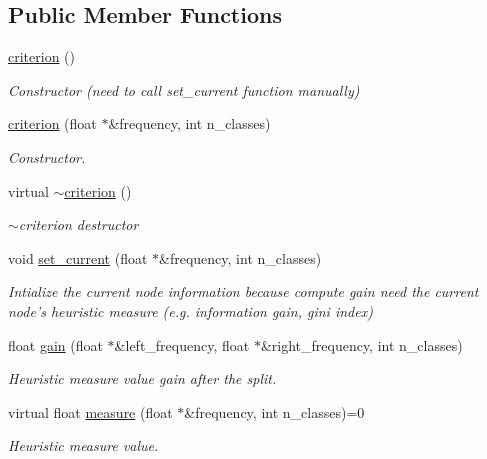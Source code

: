 \subsection*{Public Member Functions}
\begin{DoxyCompactItemize}
\item 
\hyperlink{classcriterion_a5047629e45833624bc6955cc0dd106b8}{criterion} ()
\begin{DoxyCompactList}\small\item\em Constructor (need to call {\ttfamily set\+\_\+current} function manually) \end{DoxyCompactList}\item 
\hyperlink{classcriterion_acf80c0b2acf9fb6f2b8369868cafdbff}{criterion} (float $\ast$\&frequency, int n\+\_\+classes)
\begin{DoxyCompactList}\small\item\em Constructor. \end{DoxyCompactList}\item 
virtual \hyperlink{classcriterion_aab29d10fad28cb5eeb5d3e212ecb5656}{$\sim$criterion} ()
\begin{DoxyCompactList}\small\item\em $\sim$criterion destructor \end{DoxyCompactList}\item 
void \hyperlink{classcriterion_a043c2105b2cfc256cb530c55b65156f2}{set\+\_\+current} (float $\ast$\&frequency, int n\+\_\+classes)
\begin{DoxyCompactList}\small\item\em Intialize the current node information because compute {\ttfamily gain} need the current node's heuristic measure (e.\+g. information gain, gini index) \end{DoxyCompactList}\item 
float \hyperlink{classcriterion_a8d42878c94bae5a72475b568bcbbddfa}{gain} (float $\ast$\&left\+\_\+frequency, float $\ast$\&right\+\_\+frequency, int n\+\_\+classes)
\begin{DoxyCompactList}\small\item\em Heuristic measure value gain after the split. \end{DoxyCompactList}\item 
virtual float \hyperlink{classcriterion_a1fbda0723578acd5ac612248a54ba71d}{measure} (float $\ast$\&frequency, int n\+\_\+classes)=0
\begin{DoxyCompactList}\small\item\em Heuristic measure value. \end{DoxyCompactList}\end{DoxyCompactItemize}
